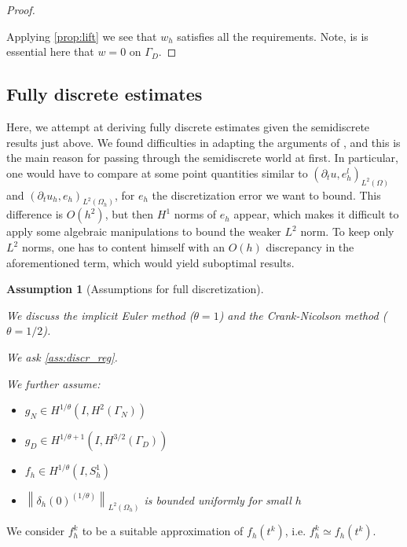 \documentclass[english,a4paper,9pt,oneside]{scrbook}	%
\theoremstyle{break}
\newtheorem{ass}[equation]{Assumption}
\newenvironment{mproof}[1][\proofname]{%
  \begin{proof}[#1]$ $\par\nobreak\ignorespaces
}{%
  \end{proof}
}
\renewcommand*{\proofname}{Proof}
\theoremstyle{remark}
\newcommand{\norm}[1]{\left\lVert#1\right\rVert}
\begin{document}
\begin{appendices}
\begin{mproof}
Applying \cref{prop:lift} we see that $w_h$ satisfies all the requirements. Note, is is essential here that $w=0$ on $\Gamma_D$.


\end{mproof}

\subsection{Fully discrete estimates}

Here, we attempt at deriving fully discrete estimates given the semidiscrete results just above. We found difficulties in adapting the arguments of \cite{thomee}, and this is the main reason for passing through the semidiscrete world at first. In particular, one would have to compare at some point quantities similar to $(\partial_t u, e_h^l)_{L^2(\Omega)}$ and $(\partial_t u_h, e_h)_{L^2(\Omega_h)}$, for $e_h$ the discretization error we want to bound. This difference is $O(h^2)$, but then $H^1$ norms of $e_h$ appear, which makes it difficult to apply some algebraic manipulations to bound the weaker $L^2$ norm. To keep only $L^2$ norms, one has to content himself with an $O(h)$ discrepancy in the aforementioned term, which would yield suboptimal results.

\begin{ass}[Assumptions for full discretization]
\label{ass:full_discr_smoothness}
\textcolor{white}{ }

We discuss the implicit Euler method ($\theta=1$) and the Crank-Nicolson method ($\theta=1/2$).

We ask \cref{ass:discr_reg}.

We further assume:

\begin{itemize}
	\item $g_N \in H^{1/\theta}(I, H^2(\Gamma_N))$
	\item $g_D \in H^{1/\theta+1}(I, H^{3/2}(\Gamma_D))$
	\item $f_h\in H^{1/\theta}(I, S^1_{h})$
	\item $\norm{\delta_{h}(0)^{(1/\theta)}}_{L^2(\Omega_h)}$ is bounded uniformly for small $h$
\end{itemize}

\end{ass}

We consider $f_h^k$ to be a suitable approximation of $f_h(t^k)$, i.e. $f_h^k \simeq f_h(t^k)$.


\end{appendices}
\end{document}
